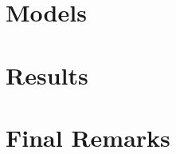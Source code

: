 \documentclass[
	12pt, 
	]{article}
\begin{document}


\newpage


\section{Models}\label{sec:model}



\newpage




\newpage








\newpage


\section{Results}



\newpage



\newpage


\section{Final Remarks}



\newpage
\end{document}
